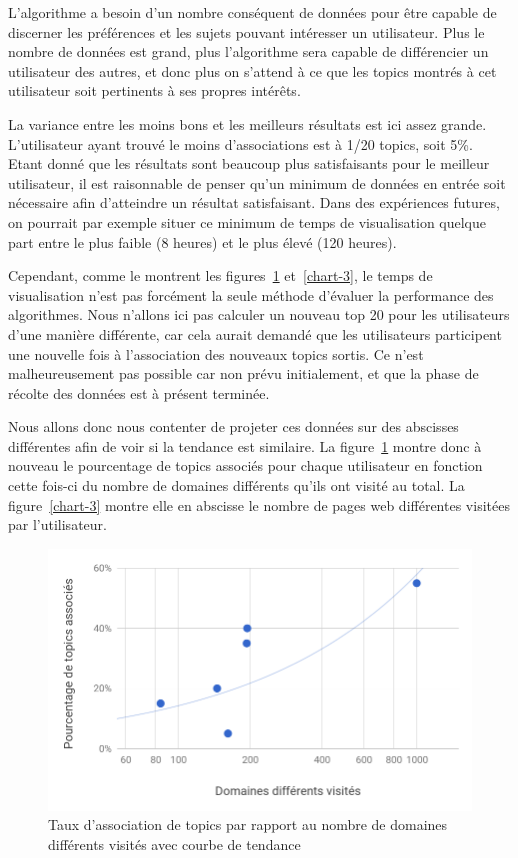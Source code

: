 			L'algorithme a besoin d'un nombre conséquent de données pour être capable de discerner les préférences et les sujets pouvant intéresser un utilisateur. Plus le nombre de données est grand, plus l'algorithme sera capable de différencier un utilisateur des autres, et donc plus on s'attend à ce que les topics montrés à cet utilisateur soit pertinents à ses propres intérêts.

			La variance entre les moins bons et les meilleurs résultats est ici assez grande. L'utilisateur ayant trouvé le moins d'associations est à 1/20 topics, soit 5\%. Etant donné que les résultats sont beaucoup plus satisfaisants pour le meilleur utilisateur, il est raisonnable de penser qu'un minimum de données en entrée soit nécessaire afin d'atteindre un résultat satisfaisant. Dans des expériences futures, on pourrait par exemple situer ce minimum de temps de visualisation quelque part entre le plus faible (8 heures) et le plus élevé (120 heures).

			Cependant, comme le montrent les figures~\ref{chart-2} et~\ref{chart-3}, le temps de visualisation n'est pas forcément la seule méthode d'évaluer la performance des algorithmes. Nous n'allons ici pas calculer un nouveau top 20 pour les utilisateurs d'une manière différente, car cela aurait demandé que les utilisateurs participent une nouvelle fois à l'association des nouveaux topics sortis. Ce n'est malheureusement pas possible car non prévu initialement, et que la phase de récolte des données est à présent terminée.
			
			Nous allons donc nous contenter de projeter ces données sur des abscisses différentes afin de voir si la tendance est similaire. La figure~\ref{chart-2} montre donc à nouveau le pourcentage de topics associés pour chaque utilisateur en fonction cette fois-ci du nombre de domaines différents qu'ils ont visité au total. La figure~\ref{chart-3} montre elle en abscisse le nombre de pages web différentes visitées par l'utilisateur.

			\begin{figure}[!h]
				\centering
				\includegraphics[height=0.6\textwidth]{images/results/chart-2}
				\caption{Taux d'association de topics par rapport au nombre de domaines différents visités avec courbe de tendance}
				\label{chart-2}
			\end{figure}

